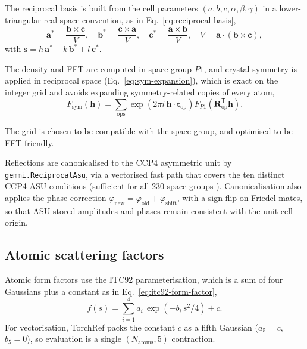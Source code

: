 \documentclass{iucrjournals}
\begin{document}
The reciprocal basis is built from the cell parameters
$(a,b,c,\alpha,\beta,\gamma)$ in a lower-triangular real-space convention,
as in Eq.~\ref{eq:reciprocal-basis},
%
\begin{equation}
  \mathbf{a}^{*} = \frac{\mathbf{b}\times\mathbf{c}}{V},\quad
  \mathbf{b}^{*} = \frac{\mathbf{c}\times\mathbf{a}}{V},\quad
  \mathbf{c}^{*} = \frac{\mathbf{a}\times\mathbf{b}}{V},\quad
  V = \mathbf{a}\cdot(\mathbf{b}\times\mathbf{c}),
  \label{eq:reciprocal-basis}
\end{equation}
%
with $\mathbf{s} = h\,\mathbf{a}^{*} + k\,\mathbf{b}^{*} + l\,\mathbf{c}^{*}$.

The density and FFT are computed in space group $P1$, and crystal symmetry is
applied in reciprocal space (Eq.~\ref{eq:sym-expansion}), which is exact on
the integer grid and avoids expanding symmetry-related copies of every atom,
%
\begin{equation}
  F_\mathrm{sym}(\mathbf{h}) = \sum_\mathrm{ops}
  \exp\!\left(2\pi i\,\mathbf{h}\cdot\mathbf{t}_\mathrm{op}\right)
  F_{P1}\!\left(\mathbf{R}_\mathrm{op}^{\mathsf{T}}\mathbf{h}\right).
  \label{eq:sym-expansion}
\end{equation}

The grid is chosen to be compatible with the space group, and optimised to be FFT-friendly.

Reflections are canonicalised to the CCP4 asymmetric unit by
\texttt{gemmi.ReciprocalAsu}, via a vectorised fast path that covers the
ten distinct CCP4 ASU conditions (sufficient for all 230 space groups
\cite{agirre_ccp4_2023, wojdyr_gemmi_2022}).  Canonicalisation also
applies the phase correction
$\varphi_\mathrm{new} = \varphi_\mathrm{old} + \varphi_\mathrm{shift}$,
with a sign flip on Friedel mates, so that ASU-stored amplitudes and
phases remain consistent with the unit-cell origin.

\subsection{Atomic scattering factors}

Atomic form factors use the ITC92 parameterisation, which is a sum of
four Gaussians plus a constant
\cite{wilson_international_1992} as in Eq.~\ref{eq:itc92-form-factor},
%
\begin{equation}
  f(s) = \sum_{i=1}^{4} a_{i}\,\exp\!\left(-b_{i}\,s^{2}/4\right) + c.
  \label{eq:itc92-form-factor}
\end{equation}
%
For vectorisation, TorchRef packs the constant $c$ as a fifth Gaussian
($a_{5} = c$, $b_{5} = 0$), so evaluation is a single
$(N_{\mathrm{atoms}}, 5)$ contraction.
\end{document}
